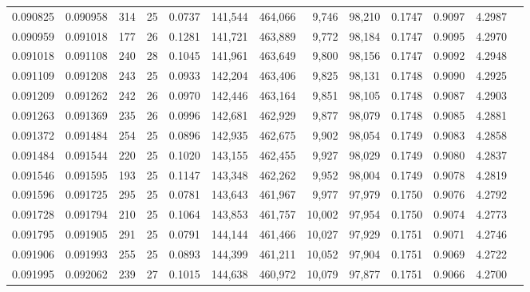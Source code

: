 \begin{tabular}{rrrrrrrrrrrrr}
0.090825 & 0.090958 & 314 &  25 &                                     0.0737 & 141,544 & 464,066 &   9,746 &  98,210 & 0.1747 & 0.9097 & 4.2987 \\
0.090959 & 0.091018 & 177 &  26 &                                     0.1281 & 141,721 & 463,889 &   9,772 &  98,184 & 0.1747 & 0.9095 & 4.2970 \\
0.091018 & 0.091108 & 240 &  28 &                                     0.1045 & 141,961 & 463,649 &   9,800 &  98,156 & 0.1747 & 0.9092 & 4.2948 \\
0.091109 & 0.091208 & 243 &  25 &                                     0.0933 & 142,204 & 463,406 &   9,825 &  98,131 & 0.1748 & 0.9090 & 4.2925 \\
0.091209 & 0.091262 & 242 &  26 &                                     0.0970 & 142,446 & 463,164 &   9,851 &  98,105 & 0.1748 & 0.9087 & 4.2903 \\
0.091263 & 0.091369 & 235 &  26 &                                     0.0996 & 142,681 & 462,929 &   9,877 &  98,079 & 0.1748 & 0.9085 & 4.2881 \\
0.091372 & 0.091484 & 254 &  25 &                                     0.0896 & 142,935 & 462,675 &   9,902 &  98,054 & 0.1749 & 0.9083 & 4.2858 \\
0.091484 & 0.091544 & 220 &  25 &                                     0.1020 & 143,155 & 462,455 &   9,927 &  98,029 & 0.1749 & 0.9080 & 4.2837 \\
0.091546 & 0.091595 & 193 &  25 &                                     0.1147 & 143,348 & 462,262 &   9,952 &  98,004 & 0.1749 & 0.9078 & 4.2819 \\
0.091596 & 0.091725 & 295 &  25 &                                     0.0781 & 143,643 & 461,967 &   9,977 &  97,979 & 0.1750 & 0.9076 & 4.2792 \\
0.091728 & 0.091794 & 210 &  25 &                                     0.1064 & 143,853 & 461,757 &  10,002 &  97,954 & 0.1750 & 0.9074 & 4.2773 \\
0.091795 & 0.091905 & 291 &  25 &                                     0.0791 & 144,144 & 461,466 &  10,027 &  97,929 & 0.1751 & 0.9071 & 4.2746 \\
0.091906 & 0.091993 & 255 &  25 &                                     0.0893 & 144,399 & 461,211 &  10,052 &  97,904 & 0.1751 & 0.9069 & 4.2722 \\
0.091995 & 0.092062 & 239 &  27 &                                     0.1015 & 144,638 & 460,972 &  10,079 &  97,877 & 0.1751 & 0.9066 & 4.2700 \\

\end{tabular}
